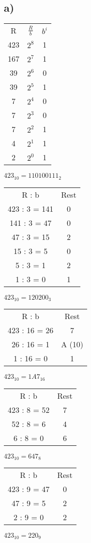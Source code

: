 \documentclass{article}
\begin{document}
	\subsection*{a)}
	\begin{tabular}[h]{c|c|c}
		R & $\frac{R}{b}$ & $b^i$ \\
		423 & $2^8$ & 1 \\
		167 & $2^7$ & 1 \\
		39 & $2^6$ & 0 \\
		39 & $2^5$ & 1 \\
		7 & $2^4$ & 0 \\
		7 & $2^3$ & 0 \\
		7 & $2^2$ & 1 \\
		4 & $2^1$ & 1 \\
		2 & $2^0$ & 1 \\
	\end{tabular}
	$423_{10} = 110100111_2$ \\
	\begin{tabular}[h]{c|c}
		R : b & Rest \\
		423 : 3 = 141 & 0 \\
		141 : 3 = 47 & 0 \\
		47 : 3 = 15 & 2 \\
		15 : 3 = 5 & 0 \\
		5 : 3 = 1 & 2 \\
		1 : 3 = 0 & 1
	\end{tabular}
	$423_{10} = 120200_3$ \\
	\begin{tabular}[h]{c|c}
		R : b & Rest \\
		423 : 16 = 26 & 7 \\
		26 : 16 = 1 & A (10) \\
		1 : 16 = 0 & 1
	\end{tabular}
	$423_{10} = 1A7_{16}$ \\
	\begin{tabular}[h]{c|c}
		R : b & Rest \\
		423 : 8 = 52 & 7 \\
		52 : 8 = 6 & 4 \\
		6 : 8 = 0 & 6
	\end{tabular}
	$423_{10} = 647_8$ \\
	\begin{tabular}[h]{c|c}
		R : b & Rest \\
		423 : 9 = 47 & 0 \\
		47 : 9 = 5 & 2 \\
		2 : 9 = 0 & 2
	\end{tabular}
	$423_{10} = 220_9$
\end{document}
